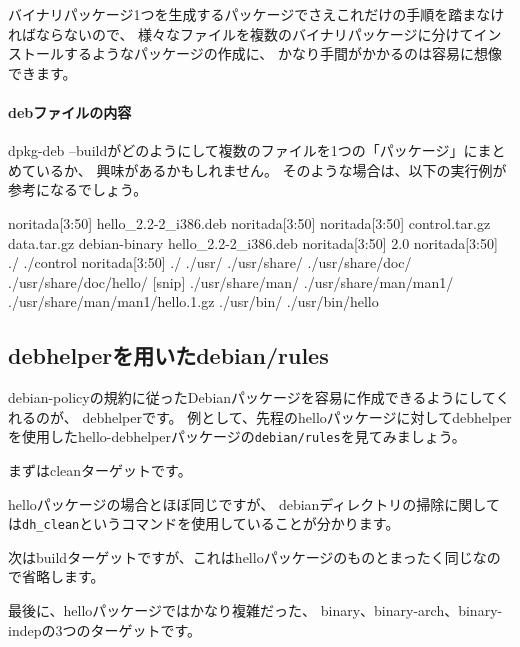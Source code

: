 \documentclass[mingoth,a4paper]{jsarticle}
\begin{document}
バイナリパッケージ1つを生成するパッケージでさえこれだけの手順を踏まなければならないので、
様々なファイルを複数のバイナリパッケージに分けてインストールするようなパッケージの作成に、
かなり手間がかかるのは容易に想像できます。

\begin{screen}
\paragraph*{debファイルの内容}

dpkg-deb --buildがどのようにして複数のファイルを1つの「パッケージ」にまとめているか、
興味があるかもしれません。
そのような場合は、以下の実行例が参考になるでしょう。

\begin{commandline}
noritada[3:50]%
hello_2.2-2_i386.deb
noritada[3:50]%
noritada[3:50]%
control.tar.gz	data.tar.gz  debian-binary  hello_2.2-2_i386.deb
noritada[3:50]%
2.0
noritada[3:50]%
./
./control
noritada[3:50]%
./
./usr/
./usr/share/
./usr/share/doc/
./usr/share/doc/hello/
[snip]
./usr/share/man/
./usr/share/man/man1/
./usr/share/man/man1/hello.1.gz
./usr/bin/
./usr/bin/hello
\end{commandline}
\end{screen}

\subsection{debhelperを用いたdebian/rules}

debian-policyの規約に従ったDebianパッケージを容易に作成できるようにしてくれるのが、
debhelperです。
例として、先程のhelloパッケージに対してdebhelperを使用したhello-debhelperパッケージの\texttt{debian/rules}を見てみましょう。

まずはcleanターゲットです。


helloパッケージの場合とほぼ同じですが、
debianディレクトリの掃除に関しては\texttt{dh\_clean}というコマンドを使用していることが分かります。

次はbuildターゲットですが、これはhelloパッケージのものとまったく同じなので省略します。

最後に、helloパッケージではかなり複雑だった、
binary、binary-arch、binary-indepの3つのターゲットです。
\end{document}
